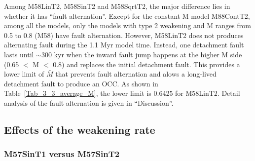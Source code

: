 Among M58LinT2, M58SinT2 and M58SqrtT2, the major difference lies in whether it has ``fault alternation''. Except for the constant M model M88ContT2, among all the models, only the models with type 2 weakening and M ranges from 0.5 to 0.8 (M58) have fault alternation. However, M58LinT2 does not produces alternating fault during the 1.1 Myr model time. Instead, one detachment fault lasts until $\sim$300 kyr when the inward fault jump happens at the higher M side (0.65 $<$ M $<$ 0.8) and replaces the initial detachment fault. This provides a lower limit of $\bar{M}$ that prevents fault alternation and alows a long-lived detachment fault to produce an OCC. As shown in Table~\hyperref[Tab_3_3_average_M]{\ref{Tab_3_3_average_M}}, the lower limit is 0.6425 for M58LinT2. Detail analysis of the fault alternation is given in ``Discussion''.

\subsection{Effects of the weakening rate}

\subsubsection{M57SinT1 versus M57SinT2}


